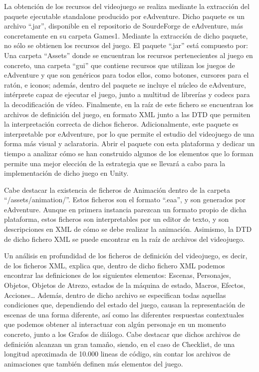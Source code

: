 La obtención de los recursos del videojuego se realiza mediante la extracción del paquete ejecutable standalone producido por eAdventure. Dicho paquete es un archivo “.jar”, disponible en el repositorio de SourdeForge de eAdventure, más concretamente en su carpeta Games1. Mediante la extracción de dicho paquete, no sólo se obtienen los recursos del juego. El paquete “.jar” está compuesto por: Una carpeta “Assets” donde se encuentran los recursos pertenecientes al juego en concreto, una carpeta “gui” que contiene recursos que utilizan los juegos de eAdventure y que son genéricos para todos ellos, como botones, cursores para el ratón, e iconos; además, dentro del paquete se incluye el núcleo de eAdventure, intérprete capaz de ejecutar el juego, junto a multitud de librerías y codecs para la decodificación de vídeo. Finalmente, en la raíz de este fichero se encuentran los archivos de definición del juego, en formato XML junto a las DTD que permiten la interpretación correcta de dichos ficheros. Adicionalmente, este paquete es interpretable por eAdventure, por lo que permite el estudio del videojuego de una forma más visual y aclaratoria. Abrir el paquete con esta plataforma y dedicar un tiempo a analizar cómo se han construido algunos de los elementos que lo forman permite una mejor elección de la estrategia que se llevará a cabo para la implementación de dicho juego en Unity.

Cabe destacar la existencia de ficheros de Animación dentro de la carpeta “/assets/animation/”. Estos ficheros son el formato “.eaa”, y son generados por eAdventure. Aunque en primera instancia parezcan un formato propio de dicha plataforma, estos ficheros son interpretables por un editor de texto, y son descripciones en XML de cómo se debe realizar la animación. Asimismo, la DTD de dicho fichero XML se puede encontrar en la raíz de archivos del videojuego. 

Un análisis en profundidad de los ficheros de definición del videojuego, es decir, de los ficheros XML, explica que, dentro de dicho fichero XML podemos encontrar las definiciones de los siguientes elementos: Escenas, Personajes, Objetos, Objetos de Atrezo, estados de la máquina de estado, Macros, Efectos, Acciones… Además, dentro de dicho archivo se especifican todas aquellas condiciones que, dependiendo del estado del juego, causan la representación de escenas de una forma diferente, así como las diferentes respuestas contextuales que podemos obtener al interactuar con algún personaje en un momento concreto, junto a los Grafos de diálogo. Cabe destacar que dichos archivos de definición alcanzan un gran tamaño, siendo, en el caso de Checklist, de una longitud aproximada de 10.000 lineas de código, sin contar los archivos de animaciones que también definen más elementos del juego. 

